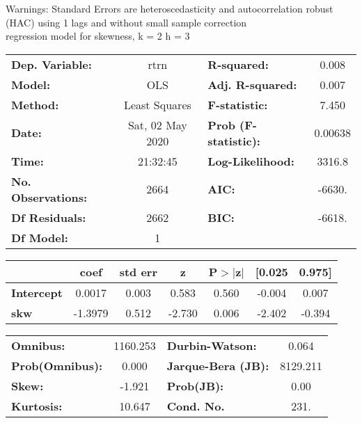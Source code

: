 Warnings: \newline
 [1] Standard Errors are heteroscedasticity and autocorrelation robust (HAC) using 1 lags and without small sample correction\\ 

regression model for skewness, k = 2 h = 3\begin{center}
\begin{tabular}{lclc}
\toprule
\textbf{Dep. Variable:}    &       rtrn       & \textbf{  R-squared:         } &     0.008   \\
\textbf{Model:}            &       OLS        & \textbf{  Adj. R-squared:    } &     0.007   \\
\textbf{Method:}           &  Least Squares   & \textbf{  F-statistic:       } &     7.450   \\
\textbf{Date:}             & Sat, 02 May 2020 & \textbf{  Prob (F-statistic):} &  0.00638    \\
\textbf{Time:}             &     21:32:45     & \textbf{  Log-Likelihood:    } &    3316.8   \\
\textbf{No. Observations:} &        2664      & \textbf{  AIC:               } &    -6630.   \\
\textbf{Df Residuals:}     &        2662      & \textbf{  BIC:               } &    -6618.   \\
\textbf{Df Model:}         &           1      & \textbf{                     } &             \\
\bottomrule
\end{tabular}
\begin{tabular}{lcccccc}
                   & \textbf{coef} & \textbf{std err} & \textbf{z} & \textbf{P$> |$z$|$} & \textbf{[0.025} & \textbf{0.975]}  \\
\midrule
\textbf{Intercept} &       0.0017  &        0.003     &     0.583  &         0.560        &       -0.004    &        0.007     \\
\textbf{skw}       &      -1.3979  &        0.512     &    -2.730  &         0.006        &       -2.402    &       -0.394     \\
\bottomrule
\end{tabular}
\begin{tabular}{lclc}
\textbf{Omnibus:}       & 1160.253 & \textbf{  Durbin-Watson:     } &    0.064  \\
\textbf{Prob(Omnibus):} &   0.000  & \textbf{  Jarque-Bera (JB):  } & 8129.211  \\
\textbf{Skew:}          &  -1.921  & \textbf{  Prob(JB):          } &     0.00  \\
\textbf{Kurtosis:}      &  10.647  & \textbf{  Cond. No.          } &     231.  \\
\bottomrule
\end{tabular}
\end{center}

